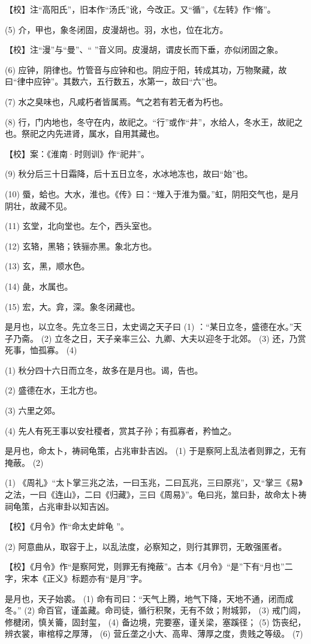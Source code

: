 \documentclass[12pt,UTF8]{ctexbook}
\begin{document}
【校】注“高阳氏”，旧本作“汤氏”讹，今改正。又“循”，《左转》作“脩”。

(5) 介，甲也，象冬闭固，皮漫胡也。羽，水也，位在北方。

【校】注“漫”与“曼”、“ ”音义同。皮漫胡，谓皮长而下垂，亦似闭固之象。

(6) 应钟，阴律也。竹管音与应钟和也。阴应于阳，转成其功，万物聚藏，故曰“律中应钟”。其数六，五行数五，水第一，故曰“六”也。

(7) 水之臭味也，凡咸朽者皆属焉。气之若有若无者为朽也。

(8) 行，门内地也，冬守在内，故祀之。“行”或作“井”，水给人，冬水王，故祀之也。祭祀之内先进肾，属水，自用其藏也。

【校】案：《淮南·时则训》作“祀井”。

(9) 秋分后三十日霜降，后十五日立冬，水冰地冻也，故曰“始”也。

(10) 蜃，蛤也。大水，淮也。《传》曰：“雉入于淮为蜃。”虹，阴阳交气也，是月阴壮，故藏不见。

(11) 玄堂，北向堂也。左个，西头室也。

(12) 玄辂，黑辂；铁骊亦黑。象北方也。

(13) 玄，黑，顺水色。

(14) 彘，水属也。

(15) 宏，大。弇，深。象冬闭藏也。

是月也，以立冬。先立冬三日，太史谒之天子曰 (1) ：“某日立冬，盛德在水。”天子乃斋。 (2) 立冬之日，天子亲率三公、九卿、大夫以迎冬于北郊。 (3) 还，乃赏死事，恤孤寡。 (4)

(1) 秋分四十六日而立冬，故多在是月也。谒，告也。

(2) 盛德在水，王北方也。

(3) 六里之郊。

(4) 先人有死王事以安社稷者，赏其子孙；有孤寡者，矜恤之。

是月也，命太卜，祷祠龟策，占兆审卦吉凶。 (1) 于是察阿上乱法者则罪之，无有掩蔽。 (2)

(1) 《周礼》“太卜掌三兆之法，一曰玉兆，二曰瓦兆，三曰原兆”，又“掌三《易》之法，一曰《连山》，二曰《归藏》，三曰《周易》”。龟曰兆，筮曰卦，故命太卜祷祠龟策，占兆审卦以知吉凶。

【校】《月令》作“命太史衅龟 ”。

(2) 阿意曲从，取容于上，以乱法度，必察知之，则行其罪罚，无敢强匿者。

【校】《月令》作“是察阿党，则罪无有掩蔽”。古本《月令》“是”下有“月也”二字，宋本《正义》标题亦有“是月”字。

是月也，天子始裘。 (1) 命有司曰：“天气上腾，地气下降，天地不通，闭而成冬。” (2) 命百官，谨盖藏。命司徒，循行积聚，无有不敛；附城郭， (3) 戒门闾，修楗闭，慎关籥，固封玺， (4) 备边境，完要塞，谨关梁，塞蹊径； (5) 饬丧纪，辨衣裳，审棺椁之厚薄， (6) 营丘垄之小大、高卑、薄厚之度，贵贱之等级。 (7)
\end{document}
